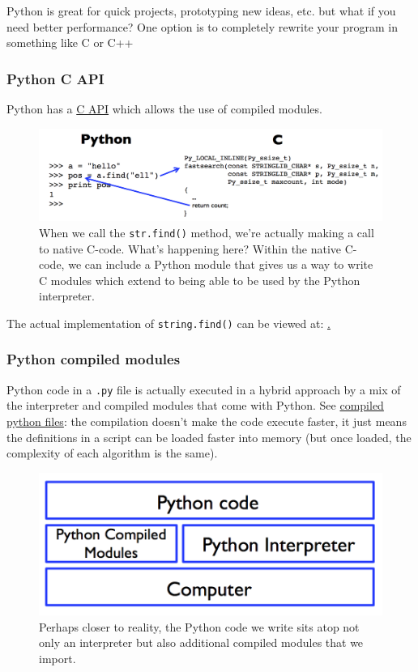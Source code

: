 \documentclass[12pt,letterpaper,twoside]{article}
\begin{document}
Python is great for quick projects, prototyping new ideas, etc. but
what if you need better performance?
One option is to completely rewrite your program in something like
C or C++

\subsubsection{Python C API}
Python has a \href{https://docs.python.org/3/c-api/intro.html}{C API}
which allows the use of compiled modules.

\begin{figure}[h]
\centering
\includegraphics[scale=0.45]{fig/python-c-interface.png}
\caption{When we call the \texttt{str.find()} method, we're actually
  making a call to native C-code. What's happening here?
  Within the native C-code, we can
  include a Python module that gives us a way to write C modules which
  extend to being able to be used by the Python interpreter.}
\end{figure}

The actual implementation of \texttt{string.find()} can be viewed at:
\href{https://github.com/python/cpython/blob/master/Objects/stringlib/fastsearch.h}.

\subsubsection{Python compiled modules}

Python code in a \texttt{.py} file is actually executed in a hybrid
approach by a mix of the interpreter and compiled modules that come
with Python. See
\href{https://docs.python.org/3/tutorial/modules.html#compiled-python-files}{compiled
  python files}: the compilation doesn't make the code execute faster,
it just means the definitions in a script can be loaded faster into
memory (but once loaded, the complexity of each algorithm is the same).

\begin{figure}[h]
\centering
\includegraphics[scale=0.45]{fig/python-compiled-modules.png}
\caption{Perhaps closer to reality, the Python code we write sits atop
not only an interpreter but also additional compiled modules that we
import.}
\end{figure}
\end{document}
